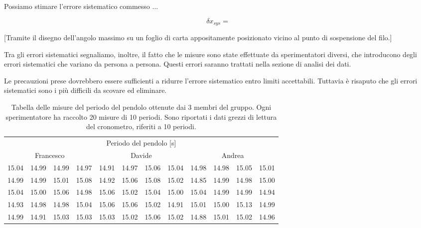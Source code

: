 Possiamo stimare l'errore sistematico commesso ...

\begin{equation}
    \delta x_{sys} = 
\end{equation}

[Tramite il disegno dell'angolo massimo su un foglio di carta appositamente
posizionato vicino al punto di sospensione del filo.]

Tra gli errori sistematici segnaliamo, inoltre, il fatto che le misure sono state
effettuate da sperimentatori diversi, che introducono degli errori sistematici
che variano da persona a persona. Questi errori saranno trattati nella sezione
di analisi dei dati.

Le precauzioni prese dovrebbero essere sufficienti a ridurre l'errore sistematico
entro limiti accettabili. Tuttavia è risaputo che gli errori sistematici
sono i più difficili da scovare ed eliminare.
	
\begin{table}[bt]
	\begin{tabular} {c c c c | c c c c | c c c c}
		\toprule
		\multicolumn{12}{c}{Periodo del pendolo [s]} \\
		\multicolumn{4}{c}{Francesco} & \multicolumn{4}{c}{Davide} & \multicolumn{4}{c}{Andrea} \\
		\midrule
		15.04 & 14.99 & 14.99 & 14.97 & 14.91 & 14.97 & 15.06 & 15.04 & 14.98 & 14.98 & 15.05 & 15.01 \\
		14.99 & 14.99 & 15.01 & 15.08 & 14.92 & 15.06 & 15.08 & 15.02 & 14.85 & 14.99 & 14.98 & 15.00 \\
		15.04 & 15.00 & 15.06 & 14.98 & 15.06 & 15.02 & 15.04 & 15.00 & 15.04 & 14.99 & 14.99 & 14.94 \\
		14.93 & 14.98 & 14.98 & 15.04 & 15.06 & 15.06 & 15.02 & 14.91 & 15.01 & 15.00 & 15.13 & 14.99 \\
		14.99 & 14.91 & 15.03 & 15.03 & 15.03 & 15.02 & 15.06 & 15.02 & 14.88 & 15.01 & 15.02 & 14.96 \\
		\bottomrule
	\end{tabular}

	\caption{Tabella delle misure del periodo del pendolo ottenute dai 3 membri del gruppo.
        Ogni sperimentatore ha raccolto 20 misure di 10 periodi. Sono riportati
        i dati grezzi di lettura del cronometro, riferiti a 10 periodi. }
    \label{tab:pendolo}
\end{table}

